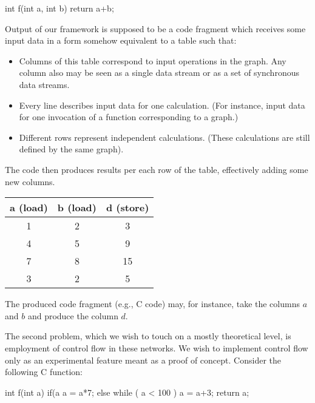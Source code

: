 \mybeginfig
\begin{code}
int f(int a, int b)
{
  return a+b;
}
\end{code}


Output of our framework is supposed to be a code fragment which receives some input data in a form somehow equivalent to a table such that:
\begin{itemize}
  \item Columns of this table correspond to input operations in the graph. Any column also may be seen as a single data stream or as a set of synchronous data streams. 
  \item Every line describes input data for one calculation. (For instance, input data for one invocation of a function corresponding to a graph.)
  \item Different rows represent independent calculations. (These calculations are still defined by the same graph). 
\end{itemize}
The code then produces results per each row of the table, effectively adding some new columns.

  \mybeginfig
\begin{center}
  \begin{tabular}{c|c||c}
    a (load)&b (load)&d (store)\\
  \hline
  1&2&3\\
  4&5&9\\
  7&8&15\\
  3&2&5\\
  \end{tabular}
\end{center}

The produced code fragment (e.g., C code) may, for instance, take the columns $a$ and $b$ and produce the column $d$. 


The second problem, which we wish to touch on a mostly theoretical level, is employment of control flow in these networks. We wish to implement control flow only as an experimental feature meant as a proof of concept. Consider the following C function: 

\mybeginfig
\begin{code}
int f(int a)
{
  if(a %
    a = a*7;
  else
    while ( a < 100 )
      a = a+3;
  return a;
}
\end{code}

